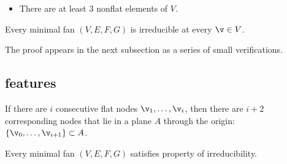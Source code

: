 \begin{definition}[irreducible]
\begin{itemize}
\item {} There are at least $3$ nonflat elements of $V$.
\end{itemize}
\end{definition}



\begin{lemma}\label{lemma:min-irred}
Every minimal fan $(V,E,F,G)$ is irreducible at every $\v\in V$.
\end{lemma}

The proof appears in the next subsection as a series of small
verifications.

\subsection{features}

If there are $i$ consecutive flat nodes $\v_1,\ldots,\v_i$, then there
are $i+2$ corresponding nodes that lie in a plane $A$ through the
origin: $\{\v_0,\ldots,\v_{i+1}\}\subset A$.

\begin{lemma}
Every minimal fan $(V,E,F,G)$ satisfies property  of
irreducibility.
\end{lemma}

